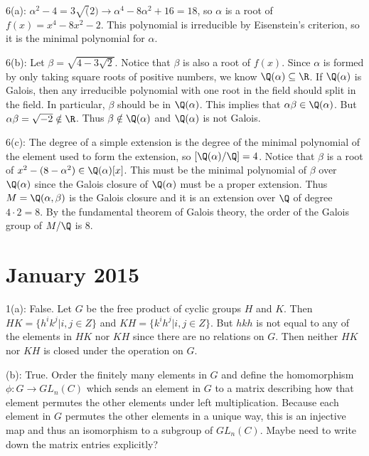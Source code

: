 \documentclass[12pt]{article}
\begin{document}
6(a): $\alpha^2 - 4 = 3\sqrt(2) \rightarrow \alpha^4 - 8 \alpha^2 + 16 = 18$, so $\alpha$ is a root of $f(x) = x^4 - 8x^2 -2$. This polynomial is irreducible by Eisenstein's criterion, so it is the minimal polynomial for $\alpha$. \newline

6(b): Let $\beta = \sqrt{4-3 \sqrt{2}}$. Notice that $\beta$ is also a root of $f(x)$. Since $\alpha$ is formed by only taking square roots of positive numbers, we know $\Q(\alpha) \subseteq \R$. If $\Q(\alpha)$ is Galois, then any irreducible polynomial with one root in the field should split in the field. In particular, $\beta$ should be in $\Q(\alpha)$. This implies that $\alpha \beta \in \Q(\alpha)$. But $\alpha \beta = \sqrt{-2} \notin \R$. Thus $\beta \notin \Q(\alpha)$ and $\Q(\alpha)$ is not Galois. \newline

6(c): The degree of a simple extension is the degree of the minimal polynomial of the element used to form the extension, so $[\Q(\alpha)/\Q] = 4$. Notice that $\beta$ is a root of $x^2 - (8-\alpha^2) \in \Q(\alpha)[x]$. This must be the minimal polynomial of $\beta$ over $\Q(\alpha)$ since the Galois closure of $\Q(\alpha)$ must be a proper extension. Thus $M = \Q(\alpha, \beta)$ is the Galois closure and it is an extension over $\Q$ of degree $4 \cdot 2 = 8$. By the fundamental theorem of Galois theory, the order of the Galois group of $M/\Q$ is 8.

\section{January 2015}
1(a): False. Let $G$ be the free product of cyclic groups $H$ and $K$. Then $HK = \{h^i k^j | i,j \in Z \}$ and $KH = \{k^i h^j | i,j \in Z \}$. But $hkh$ is not equal to any of the elements in $HK$ nor $KH$ since there are no relations on $G$. Then neither $HK$ nor $KH$ is closed under the operation on $G$. \newline

(b): True. Order the finitely many elements in $G$ and define the homomorphism $\phi:G \rightarrow GL_n(C)$ which sends an element in $G$ to a matrix describing how that element permutes the other elements under left multiplication. Because each element in $G$ permutes the other elements in a unique way, this is an injective map and thus an isomorphism to a subgroup of $GL_n(C)$. {\color{red} Maybe need to write down the matrix entries explicitly?} \newline
\end{document}
